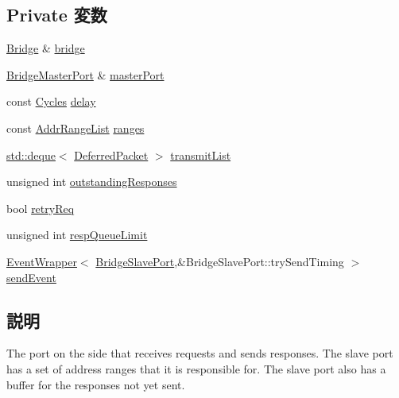 \subsection*{Private 変数}
\begin{DoxyCompactItemize}
\item 
\hyperlink{classBridge_1_1Bridge}{Bridge} \& \hyperlink{classBridge_1_1BridgeSlavePort_a6d3b24e49ac986064571195ab9905136}{bridge}
\item 
\hyperlink{classBridge_1_1BridgeMasterPort}{BridgeMasterPort} \& \hyperlink{classBridge_1_1BridgeSlavePort_ab67087190dd99cae7527467d6b6e7bbb}{masterPort}
\item 
const \hyperlink{classCycles}{Cycles} \hyperlink{classBridge_1_1BridgeSlavePort_a153dd7cdfa9816427cbbe84dce923c8d}{delay}
\item 
const \hyperlink{classstd_1_1list}{AddrRangeList} \hyperlink{classBridge_1_1BridgeSlavePort_aa51746d80e2118c6d1c670fcd6d6169e}{ranges}
\item 
\hyperlink{classstd_1_1deque}{std::deque}$<$ \hyperlink{classBridge_1_1DeferredPacket}{DeferredPacket} $>$ \hyperlink{classBridge_1_1BridgeSlavePort_a640fbfa2436c06d6f64608f76261e6e5}{transmitList}
\item 
unsigned int \hyperlink{classBridge_1_1BridgeSlavePort_a3d6ba4ec7b15c09dd3e5d3c23c1f174f}{outstandingResponses}
\item 
bool \hyperlink{classBridge_1_1BridgeSlavePort_aab3b947b2633a30b5973a39b7e9b018a}{retryReq}
\item 
unsigned int \hyperlink{classBridge_1_1BridgeSlavePort_a1da989012dff28370bdcf58a69d6769a}{respQueueLimit}
\item 
\hyperlink{classEventWrapper}{EventWrapper}$<$ \hyperlink{classBridge_1_1BridgeSlavePort}{BridgeSlavePort},\&BridgeSlavePort::trySendTiming $>$ \hyperlink{classBridge_1_1BridgeSlavePort_ae68804297f24d50ce6d825eccd46b6af}{sendEvent}
\end{DoxyCompactItemize}


\subsection{説明}
The port on the side that receives requests and sends responses. The slave port has a set of address ranges that it is responsible for. The slave port also has a buffer for the responses not yet sent. 

